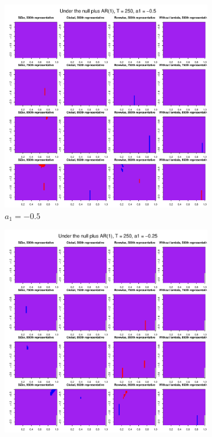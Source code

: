 \documentclass[a4paper,12pt]{article}
\begin{document}
\begin{figure}[t!]
\begin{subfigure}[b]{0.475\textwidth}
\includegraphics[width=\textwidth]{Plots/representatives_T_250_a1_-50_slope_0.pdf}
\caption{$a_1 = -0.5$}
\end{subfigure}\hspace{0.25cm}
\begin{subfigure}[b]{0.475\textwidth}
\includegraphics[width=\textwidth]{Plots/representatives_T_250_a1_-25_slope_0.pdf}

\end{subfigure}
\end{figure}
\end{document}
